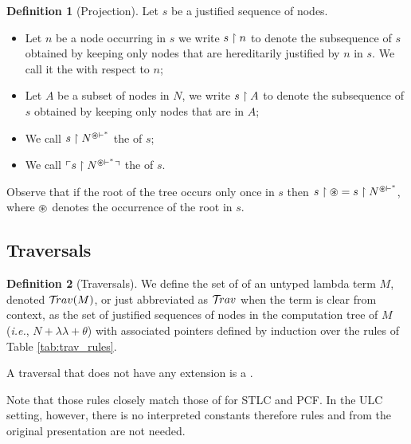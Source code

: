 \documentclass{article}
\makeatletter
\theoremstyle{definition}
\newtheorem{definition}{Definition}[section]
\newcommand\Nodes{N}%
\newcommand{\ghostlmd}{{\lambda\!\!\lambda}}
\newcommand{\ghostvar}{\theta}
\newcommand{\enables}{\vdash}
\newcommand{\NodeHjByRoot}{\Nodes^{\theroot\enables^*}}
\renewcommand\ie{{\it i.e.\@\xspace}}
\makeatother
\begin{document}
\begin{definition}[Projection]
Let $s$ be a justified sequence of nodes. 

\begin{itemize}
\item Let $n$ be a node occurring in $s$ we write $s\upharpoonright n$ to denote the subsequence of $s$ obtained by keeping only nodes that are hereditarily justified by $n$ in $s$. We call it the  with respect to $n$;
 
 \item Let $A$ be a subset of nodes in $\Nodes$, we write $s \upharpoonright A$ to denote the subsequence of $s$ obtained by keeping only nodes that are in $A$;
 
 \item We call $s\filter\NodeHjByRoot$ the  of $s$;
 
 \item We call $\pview{s\filter\NodeHjByRoot}$ the  of $s$.
\end{itemize}
\end{definition}
Observe that if the root of the tree occurs only once in $s$ then
$s \filter \theroot = s\filter\NodeHjByRoot$, where $\circledast$ denotes the occurrence of the root in $s$.



\subsection{Traversals}

\begin{definition}[Traversals]
We define the set of  of an untyped lambda term $M$, denoted $\mathcal{T}\!rav(M)$, or just abbreviated as $\mathcal{T}\!rav$ when the term is clear from context, as the set of justified sequences of nodes in the computation tree of $M$ (\ie, $\Nodes + \ghostlmd + \ghostvar$) with associated pointers defined by induction over the rules of Table \ref{tab:trav_rules}.

A traversal that does not have any extension is a .
\end{definition}

Note that those rules closely match those of \cite{BlumPhd} for STLC and PCF. In the ULC setting, however, there is no interpreted constants therefore rules  and  from the original presentation are not needed.
\end{document}
